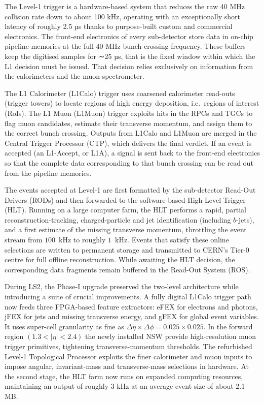The Level-1 trigger is a hardware-based system that reduces the raw 40 MHz collision rate down to about 100 kHz, operating with an exceptionally short latency of roughly 2.5 µs thanks to purpose-built custom and commercial electronics. The front-end electronics of every sub-detector store data in on-chip pipeline memories at the full 40 MHz bunch-crossing frequency. These buffers keep the digitised samples for ∼25 µs, that is the fixed window within which the L1 decision must be issued. That decision relies exclusively on information from the calorimeters and the muon spectrometer.

The L1 Calorimeter (L1Calo) trigger uses coarsened calorimeter read-outs (trigger towers) to locate regions of high energy deposition, i.e.\ regions of interest (RoIs). The L1 Muon (L1Muon) trigger exploits hits in the RPCs and TGCs to flag muon candidates, estimate their transverse momentum, and assign them to the correct bunch crossing. Outputs from L1Calo and L1Muon are merged in the Central Trigger Processor (CTP), which delivers the final verdict. If an event is accepted (an L1-Accept, or L1A), a signal is sent back to the front-end electronics so that the complete data corresponding to that bunch crossing can be read out from the pipeline memories.

The events accepted at Level-1 are first formatted by the sub-detector Read-Out Drivers (RODs) and then forwarded to the software-based High-Level Trigger (HLT). Running on a large computer farm, the HLT performs a rapid, partial reconstruction-tracking, charged-particle and jet identification (including $b$-jets), and a first estimate of the missing transverse momentum, throttling the event stream from $100$~kHz to roughly $1$~kHz. Events that satisfy these online selections are written to permanent storage and transmitted to CERN’s Tier-0 centre for full offline reconstruction. While awaiting the HLT decision, the corresponding data fragments remain buffered in the Read-Out System (ROS).

During LS2, the Phase-I upgrade preserved the two-level architecture while introducing a suite of crucial improvements. A fully digital L1Calo trigger path now feeds three FPGA-based feature extractors: eFEX for electrons and photons, jFEX for jets and missing transverse energy, and gFEX for global event variables. It uses super-cell granularity as fine as $\Delta\eta\times\Delta\phi = 0.025\times0.025$. In the forward region $(1.3<|\eta|<2.4)$ the newly installed NSW provide high-resolution muon trigger primitives, tightening transverse-momentum thresholds. The refurbished Level-1 Topological Processor exploits the finer calorimeter and muon inputs to impose angular, invariant-mass and transverse-mass selections in hardware. At the second stage, the HLT farm now runs on expanded computing resources, maintaining an output of roughly 3 kHz at an average event size of about 2.1 MB.

